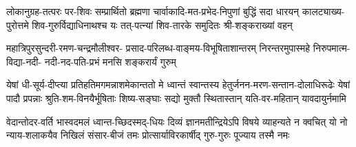 \fourlineindentedshloka
{लोकानुग्रह-तत्परः पर-शिवः सम्प्रार्थितो ब्रह्मणा}
{चार्वाकादि-मत-प्रभेद-निपुणां बुद्धिं सदा धारयन्}
{कालट्याख्य-पुरोत्तमे शिव-गुरुर्विद्याधिनाथश्च यः}
{तत्-पत्न्यां शिव-तारके समुदितः श्री-शङ्कराख्यां वहन्}

\fourlineindentedshloka
{महात्रिपुरसुन्दरी-रमण-चन्द्रमौलीश्वर-}
{प्रसाद-परिलब्ध-वाङ्मय-विभूषिताशान्तरम्}
{निरन्तरमुपास्महे निरुपमात्म-विद्या-नदी-}
{नदी-नद-पति-प्रभं मनसि शङ्करार्यं गुरुम्}














\fourlineindentedshloka
{येषां धी-सूर्य-दीप्त्या प्रतिहतिमगमन्नाशमेकान्ततो मे}
{ध्वान्तं स्वान्तस्य हेतुर्जनन-मरण-सन्तान-दोलाधिरूढेः}
{येषां पादौ प्रपन्नाः श्रुति-शम-विनयैर्भूषिताः शिष्य-सङ्घाः}
{सद्यो मुक्तौ स्थितास्तान् यति-वर-महितान् यावदायुर्नमामि}


\fourlineindentedshloka
{वेदान्तोदर-वर्ति भास्वदमलं ध्वान्त-च्छिदस्मद्-धियः}
{दिव्यं ज्ञानमतीन्द्रियेऽपि विषये व्याहन्यते न क्वचित्}
{यो नो न्याय-शलाकयैव निखिलं संसार-बीजं तमः}
{प्रोत्सार्याविरकार्षीद् गुरु-गुरुः पूज्याय तस्मै नमः}

